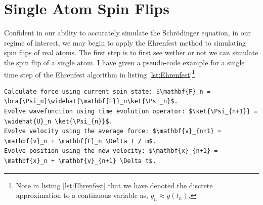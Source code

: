 
\section{Single Atom Spin Flips} \label{sec:EhrenfestSingleAtom}

Confident in our ability to accurately simulate the Schr\"odinger equation, in our regime of interest, we may begin to apply the Ehrenfest method to simulating spin flips of real atoms.
The first step is to first see wether or not we can simulate the spin flip of a single atom.
I have given a pseudo-code example for a single time step of the Ehrenfest algorithm in listing \ref{lst:Ehrenfest}\footnote{Note in listing \ref{lst:Ehrenfest} that we have denoted the discrete approximation to a continuous variable as, $g_n \approx g(t_n)$.}.
\begin{lstlisting}[float,caption=Psuedo-code algorithm for a single Ehrenfest method time step, mathescape,label= lst:Ehrenfest,stepnumber=1]
Calculate force using current spin state: $\mathbf{F}_n = \bra{\Psi_n}\widehat{\mathbf{F}}_n\ket{\Psi_n}$.
Evolve wavefunction using time evolution operator: $\ket{\Psi_{n+1}} = \widehat{U}_n \ket{\Psi_{n}}$.
Evolve velocity using the average force: $\mathbf{v}_{n+1} = \mathbf{v}_n + \mathbf{F}_n \Delta t / m$.
Evolve position using the new velocity: $\mathbf{x}_{n+1} = \mathbf{x}_n + \mathbf{v}_{n+1} \Delta t$.
\end{lstlisting}

